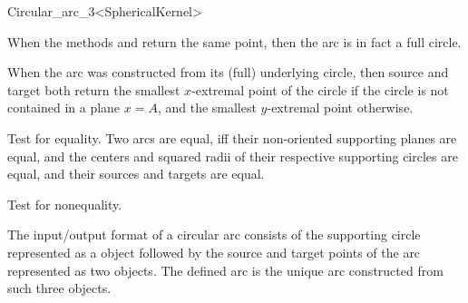 \begin{ccRefClass}{Circular_arc_3<SphericalKernel>}
\ccAccessFunctions

\ccThreeToTwo


\ccGlue
{}

\ccGlue
{}

\ccGlue
{}

When the methods  and  return the same point, then 
the arc is in fact a full circle. %

When the arc was constructed from its (full) underlying circle, then
source and target both return the smallest $x$-extremal point of the
circle if the circle is not contained in a plane $x=A$, and the smallest
$y$-extremal point otherwise.

\ccOperations

{Test for equality. Two arcs are equal, iff their non-oriented
  supporting planes are equal, and the centers and squared
  radii of their respective supporting circles are equal, and their
  sources and targets are equal.} 

{Test for nonequality.} 


\ccGlue
{}

The input/output format of a circular arc consists of the supporting circle 
represented as a  object followed by the source and target 
points of the arc represented as two  objects. 
The defined arc is the unique arc constructed from such three objects. 

\ccSeeAlso

\\

\end{ccRefClass}
